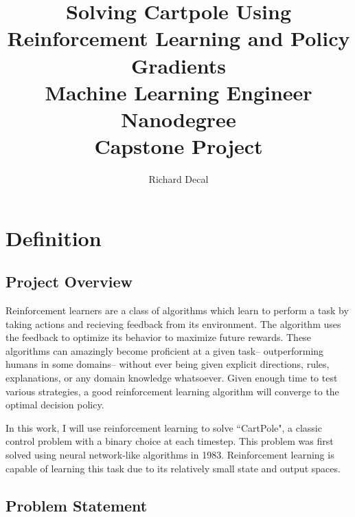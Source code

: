 \documentclass[12pt,a4paper]{article}
\author{Richard Decal}
\title{%
  Solving Cartpole Using Reinforcement Learning and Policy Gradients \\
  \large Machine Learning Engineer Nanodegree\\
  Capstone Project}
\begin{document}
\maketitle


\section{Definition}

\subsection*{Project Overview}

Reinforcement learners are a class of algorithms which learn to perform a task by taking actions and recieving feedback from its environment. The algorithm uses the feedback to optimize its behavior to maximize future rewards. These algorithms can amazingly become proficient at a given task-- outperforming humans in some domains-- without ever being given explicit directions, rules, explanations, or any domain knowledge whatsoever. Given enough time to test various strategies, a good reinforcement learning algorithm will converge to the optimal decision policy.

In this work, I will use reinforcement learning to solve ``CartPole", a classic control problem with a binary choice at each timestep. This problem was first solved using neural network-like algorithms in 1983.\cite{og_cartpole} Reinforcement learning is capable of learning this task due to its relatively small state and output spaces.\cite{deep_pg}\cite{ddpg_blog}

\subsection*{Problem Statement}
\end{document}
